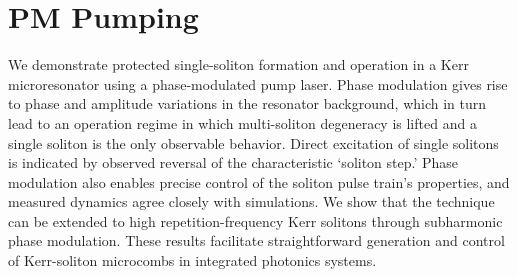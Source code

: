  \chapter{PM Pumping} \label{ch:PMPumping}




We demonstrate protected single-soliton formation and operation in a Kerr microresonator using a phase-modulated pump laser. Phase modulation gives rise to phase and amplitude variations in the resonator background, which in turn lead to an operation regime in which multi-soliton degeneracy is lifted and a single soliton is the only observable behavior. Direct excitation of single solitons is indicated by observed reversal of the characteristic ‘soliton step.’ Phase modulation also enables precise control of the soliton pulse train’s properties, and measured dynamics agree closely with simulations. We show that the technique can be extended to high repetition-frequency Kerr solitons through subharmonic phase modulation. These results facilitate straightforward generation and control of Kerr-soliton microcombs in integrated photonics systems. 



